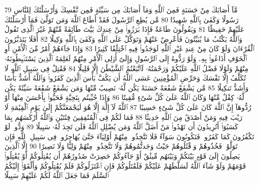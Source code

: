 {\tiny\colorbox{cl_aya}{79}} مَّآ أَصَابَكَ مِنْ حَسَنَةٍ فَمِنَ ٱللَّهِ وَمَآ أَصَابَكَ مِن سَيِّئَةٍ فَمِن نَّفْسِكَ وَأَرْسَلْنَٰكَ لِلنَّاسِ رَسُولًا وَكَفَىٰ بِٱللَّهِ شَهِيدًا
{\tiny\colorbox{cl_aya}{80}} مَّن يُطِعِ ٱلرَّسُولَ فَقَدْ أَطَاعَ ٱللَّهَ وَمَن تَوَلَّىٰ فَمَآ أَرْسَلْنَٰكَ عَلَيْهِمْ حَفِيظًا
{\tiny\colorbox{cl_aya}{81}} وَيَقُولُونَ طَاعَةٌ فَإِذَا بَرَزُوا۟ مِنْ عِندِكَ بَيَّتَ طَآئِفَةٌ مِّنْهُمْ غَيْرَ ٱلَّذِى تَقُولُ وَٱللَّهُ يَكْتُبُ مَا يُبَيِّتُونَ فَأَعْرِضْ عَنْهُمْ وَتَوَكَّلْ عَلَى ٱللَّهِ وَكَفَىٰ بِٱللَّهِ وَكِيلًا
{\tiny\colorbox{cl_aya}{82}} أَفَلَا يَتَدَبَّرُونَ ٱلْقُرْءَانَ وَلَوْ كَانَ مِنْ عِندِ غَيْرِ ٱللَّهِ لَوَجَدُوا۟ فِيهِ ٱخْتِلَٰفًا كَثِيرًا
{\tiny\colorbox{cl_aya}{83}} وَإِذَا جَآءَهُمْ أَمْرٌ مِّنَ ٱلْأَمْنِ أَوِ ٱلْخَوْفِ أَذَاعُوا۟ بِهِۦ وَلَوْ رَدُّوهُ إِلَى ٱلرَّسُولِ وَإِلَىٰٓ أُو۟لِى ٱلْأَمْرِ مِنْهُمْ لَعَلِمَهُ ٱلَّذِينَ يَسْتَنۢبِطُونَهُۥ مِنْهُمْ وَلَوْلَا فَضْلُ ٱللَّهِ عَلَيْكُمْ وَرَحْمَتُهُۥ لَٱتَّبَعْتُمُ ٱلشَّيْطَٰنَ إِلَّا قَلِيلًا
{\tiny\colorbox{cl_aya}{84}} فَقَٰتِلْ فِى سَبِيلِ ٱللَّهِ لَا تُكَلَّفُ إِلَّا نَفْسَكَ وَحَرِّضِ ٱلْمُؤْمِنِينَ عَسَى ٱللَّهُ أَن يَكُفَّ بَأْسَ ٱلَّذِينَ كَفَرُوا۟ وَٱللَّهُ أَشَدُّ بَأْسًا وَأَشَدُّ تَنكِيلًا
{\tiny\colorbox{cl_aya}{85}} مَّن يَشْفَعْ شَفَٰعَةً حَسَنَةً يَكُن لَّهُۥ نَصِيبٌ مِّنْهَا وَمَن يَشْفَعْ شَفَٰعَةً سَيِّئَةً يَكُن لَّهُۥ كِفْلٌ مِّنْهَا وَكَانَ ٱللَّهُ عَلَىٰ كُلِّ شَىْءٍ مُّقِيتًا
{\tiny\colorbox{cl_aya}{86}} وَإِذَا حُيِّيتُم بِتَحِيَّةٍ فَحَيُّوا۟ بِأَحْسَنَ مِنْهَآ أَوْ رُدُّوهَآ إِنَّ ٱللَّهَ كَانَ عَلَىٰ كُلِّ شَىْءٍ حَسِيبًا
{\tiny\colorbox{cl_aya}{87}} ٱللَّهُ لَآ إِلَٰهَ إِلَّا هُوَ لَيَجْمَعَنَّكُمْ إِلَىٰ يَوْمِ ٱلْقِيَٰمَةِ لَا رَيْبَ فِيهِ وَمَنْ أَصْدَقُ مِنَ ٱللَّهِ حَدِيثًا
{\tiny\colorbox{cl_aya}{88}} فَمَا لَكُمْ فِى ٱلْمُنَٰفِقِينَ فِئَتَيْنِ وَٱللَّهُ أَرْكَسَهُم بِمَا كَسَبُوٓا۟ أَتُرِيدُونَ أَن تَهْدُوا۟ مَنْ أَضَلَّ ٱللَّهُ وَمَن يُضْلِلِ ٱللَّهُ فَلَن تَجِدَ لَهُۥ سَبِيلًا
{\tiny\colorbox{cl_aya}{89}} وَدُّوا۟ لَوْ تَكْفُرُونَ كَمَا كَفَرُوا۟ فَتَكُونُونَ سَوَآءً فَلَا تَتَّخِذُوا۟ مِنْهُمْ أَوْلِيَآءَ حَتَّىٰ يُهَاجِرُوا۟ فِى سَبِيلِ ٱللَّهِ فَإِن تَوَلَّوْا۟ فَخُذُوهُمْ وَٱقْتُلُوهُمْ حَيْثُ وَجَدتُّمُوهُمْ وَلَا تَتَّخِذُوا۟ مِنْهُمْ وَلِيًّا وَلَا نَصِيرًا
{\tiny\colorbox{cl_aya}{90}} إِلَّا ٱلَّذِينَ يَصِلُونَ إِلَىٰ قَوْمٍۭ بَيْنَكُمْ وَبَيْنَهُم مِّيثَٰقٌ أَوْ جَآءُوكُمْ حَصِرَتْ صُدُورُهُمْ أَن يُقَٰتِلُوكُمْ أَوْ يُقَٰتِلُوا۟ قَوْمَهُمْ وَلَوْ شَآءَ ٱللَّهُ لَسَلَّطَهُمْ عَلَيْكُمْ فَلَقَٰتَلُوكُمْ فَإِنِ ٱعْتَزَلُوكُمْ فَلَمْ يُقَٰتِلُوكُمْ وَأَلْقَوْا۟ إِلَيْكُمُ ٱلسَّلَمَ فَمَا جَعَلَ ٱللَّهُ لَكُمْ عَلَيْهِمْ سَبِيلًا
